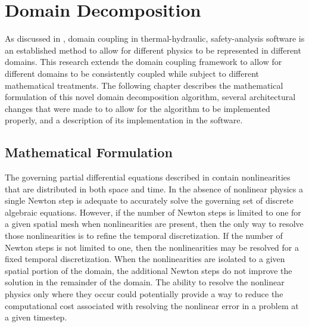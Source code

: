 \chapter{Domain Decomposition}
\label{chap:domDecomposition}
As discussed in , domain coupling in thermal-hydraulic, safety-analysis software is an established method to allow for different physics to be represented in different domains.
This research extends the domain coupling framework to allow for different domains to be consistently coupled while subject to different mathematical treatments.
The following chapter describes the mathematical formulation of this novel domain decomposition algorithm, several architectural changes that were made to \cobra{} to allow for the algorithm to be implemented properly, and a description of its implementation in the software.

\section{Mathematical Formulation}
\label{sec:domDecompMath}

The governing partial differential equations described in  contain nonlinearities that are distributed in both space and time.
In the absence of nonlinear physics a single Newton step is adequate to accurately solve the governing set of discrete algebraic equations.
However, if the number of Newton steps is limited to one for a given spatial mesh when nonlinearities are present, then the only way to resolve those nonlinearities is to refine the temporal discretization.
If the number of Newton steps is not limited to one, then the nonlinearities may be resolved for a fixed temporal discretization.
When the nonlinearities are isolated to a given spatial portion of the domain, the additional Newton steps do not improve the solution in the remainder of the domain.
The ability to resolve the nonlinear physics only where they occur could potentially provide a way to reduce the computational cost associated with resolving the nonlinear error in a problem at a given timestep.

